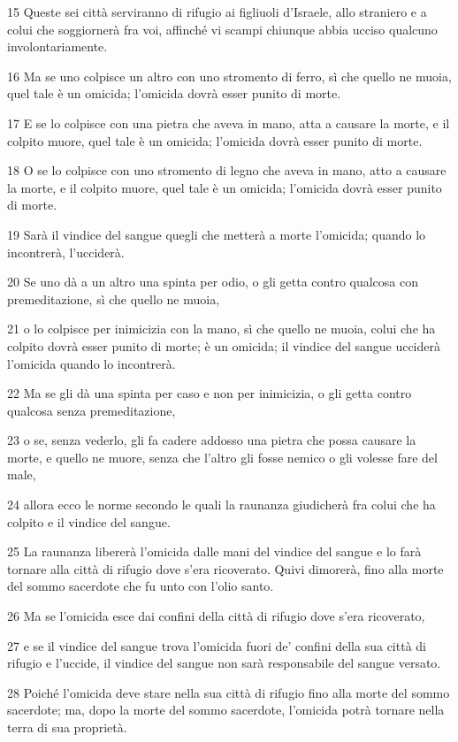 \par 15 Queste sei città serviranno di rifugio ai figliuoli d'Israele, allo straniero e a colui che soggiornerà fra voi, affinché vi scampi chiunque abbia ucciso qualcuno involontariamente.
\par 16 Ma se uno colpisce un altro con uno stromento di ferro, sì che quello ne muoia, quel tale è un omicida; l'omicida dovrà esser punito di morte.
\par 17 E se lo colpisce con una pietra che aveva in mano, atta a causare la morte, e il colpito muore, quel tale è un omicida; l'omicida dovrà esser punito di morte.
\par 18 O se lo colpisce con uno stromento di legno che aveva in mano, atto a causare la morte, e il colpito muore, quel tale è un omicida; l'omicida dovrà esser punito di morte.
\par 19 Sarà il vindice del sangue quegli che metterà a morte l'omicida; quando lo incontrerà, l'ucciderà.
\par 20 Se uno dà a un altro una spinta per odio, o gli getta contro qualcosa con premeditazione, sì che quello ne muoia,
\par 21 o lo colpisce per inimicizia con la mano, sì che quello ne muoia, colui che ha colpito dovrà esser punito di morte; è un omicida; il vindice del sangue ucciderà l'omicida quando lo incontrerà.
\par 22 Ma se gli dà una spinta per caso e non per inimicizia, o gli getta contro qualcosa senza premeditazione,
\par 23 o se, senza vederlo, gli fa cadere addosso una pietra che possa causare la morte, e quello ne muore, senza che l'altro gli fosse nemico o gli volesse fare del male,
\par 24 allora ecco le norme secondo le quali la raunanza giudicherà fra colui che ha colpito e il vindice del sangue.
\par 25 La raunanza libererà l'omicida dalle mani del vindice del sangue e lo farà tornare alla città di rifugio dove s'era ricoverato. Quivi dimorerà, fino alla morte del sommo sacerdote che fu unto con l'olio santo.
\par 26 Ma se l'omicida esce dai confini della città di rifugio dove s'era ricoverato,
\par 27 e se il vindice del sangue trova l'omicida fuori de' confini della sua città di rifugio e l'uccide, il vindice del sangue non sarà responsabile del sangue versato.
\par 28 Poiché l'omicida deve stare nella sua città di rifugio fino alla morte del sommo sacerdote; ma, dopo la morte del sommo sacerdote, l'omicida potrà tornare nella terra di sua proprietà.
